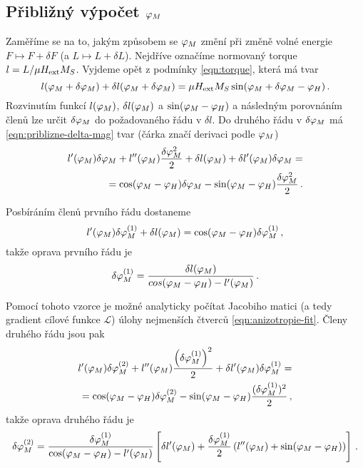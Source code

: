 \subsection*{Přibližný výpočet $\varphi_M$}

Zaměříme se na to, jakým způsobem se $\varphi_M$ změní při změně volné energie $F \mapsto F + \delta F$ (a $L \mapsto L+\delta L$).
Nejdříve označíme normovaný torque $l = L/\mu H_\textrm{ext} M_S$.
Vyjdeme opět z podmínky \eqref{eqn:torque}, která má tvar
\begin{equation}
    \label{eqn:priblizne-delta-mag}
 l(\varphi_M+\delta\varphi_M)+\delta l(\varphi_M+\delta\varphi_M) = \mu H_\textrm{ext} M_S \sin(\varphi_M+\delta \varphi_M-\varphi_H) \,.
\end{equation}
Rozvinutím funkcí $l(\varphi_M)$, $\delta l(\varphi_M)$ a $\sin(\varphi_M-\varphi_H)$ a následným porovnáním členů lze určit $\delta\varphi_M$ do požadovaného řádu v $\delta l$.
Do druhého řádu v $\delta \varphi_M$ má \eqref{eqn:priblizne-delta-mag} tvar (čárka značí derivaci podle $\varphi_M$)
\begin{align}
    l'(\varphi_M)\delta\varphi_M+l''(\varphi_M)\frac{\delta\varphi_M^2}{2} + \delta l(\varphi_M) + \delta l' (\varphi_M)\delta\varphi_M = \\
    = \cos(\varphi_M-\varphi_H) \delta\varphi_M - \sin(\varphi_M-\varphi_H) \frac{\delta\varphi_M^2}{2} \,.
\end{align}

Posbíráním členů prvního řádu dostaneme
\begin{equation}
    l'(\varphi_M)\delta\varphi_M^{(1)} + \delta l(\varphi_M) = \cos(\varphi_M-\varphi_H)\delta\varphi_M^{(1)} \,,
\end{equation}
takže oprava prvního řádu je
\begin{equation}
    \delta\varphi_M^{(1)} = \frac{\delta l(\varphi_M)}{cos(\varphi_M-\varphi_H)-l'(\varphi_M)} \,.
\end{equation}

Pomocí tohoto vzorce je možné analyticky počítat Jacobiho matici (a tedy gradient cílové funkce $\mathcal{L}$) úlohy nejmenších čtverců \eqref{eqn:anizotropie-fit}.
Členy druhého řádu jsou pak
\begin{align}
    l'(\varphi_M)\delta\varphi_M^{(2)} +  l''(\varphi_M) \frac{\left(\delta\varphi_M^{(1)}\right)^2}{2} + \delta l'(\varphi_M)\delta\varphi_M^{(1)} = \\
    = \cos(\varphi_M-\varphi_H)\delta\varphi_M^{(2)} - \sin(\varphi_M-\varphi_H) \frac{(\delta\varphi_M^{(1)})^2}{2} \,,
\end{align}
takže oprava druhého řádu je
\begin{equation}
    \delta\varphi_M^{(2)} = \frac{\delta\varphi_M^{(1)}}{\cos(\varphi_M-\varphi_H)-l'(\varphi_M)}\left[ \delta l'(\varphi_M) + \frac{\delta\varphi_M^{(1)}}{2} \left( l''(\varphi_M)+\sin(\varphi_M-\varphi_H) \right)   \right] \,.
\end{equation}

